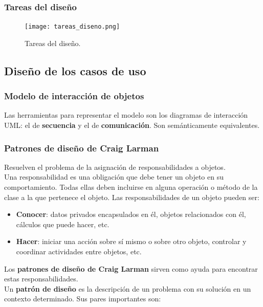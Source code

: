 \documentclass[12pt,spanish]{article}
\begin{document}
\newpage

\subsubsection{Tareas del diseño}

\begin{figure}[H]
\centering
\texttt{[image: tareas\_diseno.png]}
\caption{Tareas del diseño.}
\end{figure}

\subsection{Diseño de los casos de uso}


\subsubsection{Modelo de interacción de objetos}

Las herramientas para representar el modelo son los diagramas de interacción UML: el de \textbf{secuencia} y el de \textbf{comunicación}. Son semánticamente equivalentes.

\subsubsection{Patrones de diseño de Craig Larman}

Resuelven el problema de la asignación de responsabilidades a objetos.\\

Una responsabilidad es una obligación que debe tener un objeto en su comportamiento. Todas ellas deben incluirse en alguna operación o método de la clase a la que pertenece el objeto. Las responsabilidades de un objeto pueden ser:

\begin{itemize}
	\item \textbf{Conocer}: datos privados encapsulados en él, objetos relacionados con él, cálculos que puede hacer, etc.
	\item \textbf{Hacer}: iniciar una acción sobre sí mismo o sobre otro objeto, controlar y coordinar actividades entre objetos, etc.
\end{itemize}

Los \textbf{patrones de diseño de Craig Larman} sirven como ayuda para encontrar estas responsabilidades.\\

Un \textbf{patrón de diseño} es la descripción de un problema con su solución en un contexto determinado. Sus pares importantes son:
\end{document}
